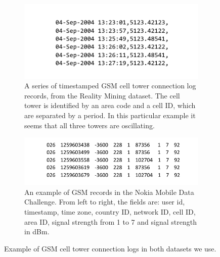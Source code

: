 \documentclass[letterpaper, 12pt, conference]{ieeeconf}
\begin{document}
\begin{figure}
        \centering
        \begin{subfigure}[t]{0.44\textwidth}
                \centering
                \includegraphics[width=\textwidth]{figs/gsm_log_rm}
                \caption{A series of timestamped GSM cell tower connection 
log records, from the Reality Mining dataset. The cell tower is identified by 
an area code and a cell ID, which are separated by a period. In this 
particular example it seems that all three towers are oscillating.}
                \label{fig:gsm_log_example}
        \end{subfigure}%
        \qquad %
        \begin{subfigure}[t]{0.48\textwidth}
                \centering
                \includegraphics[width=\textwidth]{figs/gsm_log_mdc}
                \caption{An example of GSM records in the Nokia Mobile Data 
Challenge. From left to right, the fields are: user id, timestamp, time zone, 
country ID, network ID, cell ID, area ID, signal strength from 1 to 7 and 
signal strength in dBm.}
			\label{fig:gsm_log_mdc}
        \end{subfigure}
				\caption{Example of GSM cell tower connection logs in both datasets 
we use.}
\label{fig:gsm_log_examples}
\end{figure}
\end{document}
